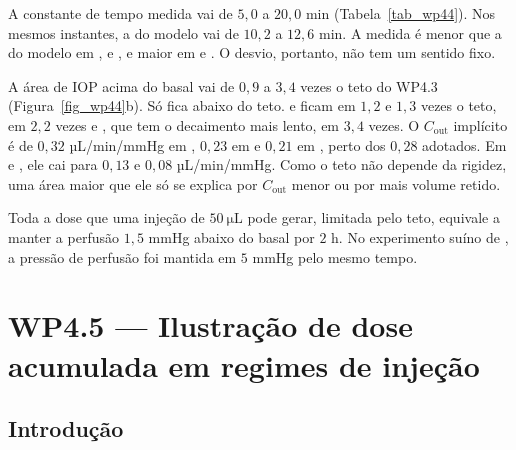 A constante de tempo medida vai de $5{,}0$ a $20{,}0$ min (Tabela~\ref{tab_wp44}). Nos mesmos instantes, a do modelo vai de $10{,}2$ a $12{,}6$ min. A medida é menor que a do modelo em \citet{sharei2010}, \citet{papazoglou2026} e \citet{lee2016}, e maior em \citet{hu2022conbercept} e \citet{soheilian2017}. O desvio, portanto, não tem um sentido fixo.

A área de IOP acima do basal vai de $0{,}9$ a $3{,}4$ vezes o teto do WP4.3 (Figura~\ref{fig_wp44}b). Só \citet{sharei2010} fica abaixo do teto. \citet{hu2022conbercept} e \citet{lee2016} ficam em $1{,}2$ e $1{,}3$ vezes o teto, \citet{papazoglou2026} em $2{,}2$ vezes e \citet{soheilian2017}, que tem o decaimento mais lento, em $3{,}4$ vezes. O $C_{\text{out}}$ implícito é de $0{,}32$ µL/min/mmHg em \citet{sharei2010}, $0{,}23$ em \citet{hu2022conbercept} e $0{,}21$ em \citet{lee2016}, perto dos $0{,}28$ adotados. Em \citet{papazoglou2026} e \citet{soheilian2017}, ele cai para $0{,}13$ e $0{,}08$ µL/min/mmHg. Como o teto não depende da rigidez, uma área maior que ele só se explica por $C_{\text{out}}$ menor ou por mais volume retido.

Toda a dose que uma injeção de $\SI{50}{\micro\liter}$ pode gerar, limitada pelo teto, equivale a manter a perfusão $1{,}5$ mmHg abaixo do basal por $2$ h. No experimento suíno de \citet{kyhn2009}, a pressão de perfusão foi mantida em $5$ mmHg pelo mesmo tempo.
\section{WP4.5 --- Ilustração de dose acumulada em regimes de injeção}
\label{sec_wp45}

\subsection{Introdução}

